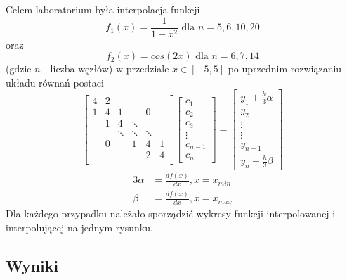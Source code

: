 Celem laboratorium była interpolacja funkcji 
\begin{equation}
f_1(x) = \frac{1}{1 + x^2} \mbox{ dla } n = 5, 6, 10, 20
\label{f1}
\end{equation}
oraz
\begin{equation}
f_2(x) = cos(2x) \mbox{ dla } n = 6, 7, 14
\label{f2}
\end{equation}
(gdzie $ n $ - liczba węzłów) w przedziale $ x\in [-5,5] $ po uprzednim rozwiązaniu układu równań postaci
\begin{equation} 
\label{uklad}
\begin{bmatrix}
4 & 2 & &  &  &  \\
1 & 4 & 1 &  & 0 &  \\
 & 1 & 4 & \ddots &  &  \\
 & &\ddots & \ddots & \ddots &\\
 & 0 &  & 1 & 4 & 1 \\
 &  &  & & 2 & 4 \\
\end{bmatrix}
\begin{bmatrix}
c_1 \\
c_2 \\
c_3 \\
\vdots \\
c_{n-1} \\
c_{n}
\end{bmatrix}
=
\begin{bmatrix}
y_1 + \frac{h}{3}\alpha \\
y_2 \\
\vdots \\
\vdots \\
y_{n-1} \\
y_{n} - \frac{h}{3}\beta
\end{bmatrix}
\end{equation}
\begin{alignat*}{3}
\alpha&= \frac{df(x)}{dx}, x = x_{min}\\
\beta &= \frac{df(x)}{dx}, x = x_{max}
\end{alignat*}
Dla każdego przypadku należało sporządzić wykresy funkcji interpolowanej i interpolującej na jednym rysunku.

\subsection{Wyniki}


